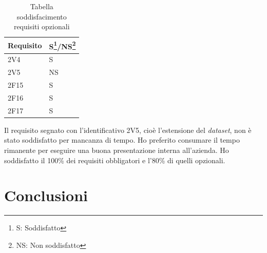 \label{tab:pian1}
\begin{table}[!ht]
\begin{tabularx}{.35\textwidth}{XX}
\hline\hline
\textbf{Requisito} & \textbf{S\footnote{S: Soddisfatto}/NS\footnote{NS: Non soddisfatto}} \\
\hline
2V4 & S\\
\hline
2V5 & NS\\
\hline
2F15 & S\\
\hline
2F16 & S\\
\hline
2F17 & S\\
\hline
\end{tabularx}
 \captionsetup{singlelinecheck = false, format= hang, justification=raggedright}
\caption{Tabella soddisfacimento requisiti opzionali}
\end{table}%
Il requisito segnato con l'identificativo 2V5, cioè l'estensione del \textit{dataset}, non è stato soddisfatto per mancanza di tempo. Ho preferito consumare il tempo rimanente per eseguire una buona presentazione interna all'azienda. Ho soddisfatto il 100\% dei requisiti obbligatori e l'80\% di quelli opzionali.
\section{Conclusioni}
